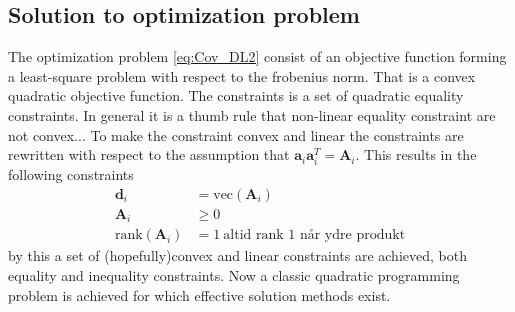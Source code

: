 \subsection{Solution to optimization problem}
The optimization problem \eqref{eq:Cov_DL2} consist of an objective function forming a least-square problem with respect to the frobenius norm.
That is a convex quadratic objective function.
The constraints is a set of quadratic equality constraints. In general it is a thumb rule that non-linear equality constraint are not convex...
To make the constraint convex and linear the constraints are rewritten with respect to the assumption that $\textbf{a}_i\textbf{a}_i^{T} = \textbf{A}_i$. This results in the following constraints 
\begin{align}
\textbf{d}_i &= \text{vec}(\textbf{A}_i) \\
\textbf{A}_i &\geq  0 \\
\text{rank}(\textbf{A}_i) &= 1 \ \text{altid rank 1 når ydre produkt}
\end{align}          
by this a set of (hopefully)convex and linear constraints are achieved, both equality and inequality constraints.
Now a classic quadratic programming problem is achieved      for which effective solution methods exist.   

